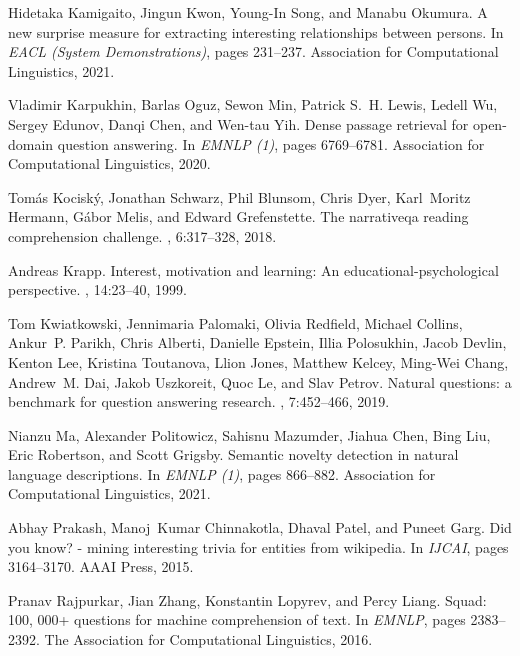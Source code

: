 \documentclass[11pt]{article}
\begin{document}
\begin{thebibliography}{10}
Hidetaka Kamigaito, Jingun Kwon, Young{-}In Song, and Manabu Okumura.
\newblock A new surprise measure for extracting interesting relationships between persons.
\newblock In {\em {EACL} (System Demonstrations)}, pages 231--237. Association for Computational Linguistics, 2021.

Vladimir Karpukhin, Barlas Oguz, Sewon Min, Patrick S.~H. Lewis, Ledell Wu, Sergey Edunov, Danqi Chen, and Wen{-}tau Yih.
\newblock Dense passage retrieval for open-domain question answering.
\newblock In {\em {EMNLP} {(1)}}, pages 6769--6781. Association for Computational Linguistics, 2020.

Tom{\'{a}}s Kocisk{\'{y}}, Jonathan Schwarz, Phil Blunsom, Chris Dyer, Karl~Moritz Hermann, G{\'{a}}bor Melis, and Edward Grefenstette.
\newblock The narrativeqa reading comprehension challenge.
, 6:317--328, 2018.

Andreas Krapp.
\newblock Interest, motivation and learning: An educational-psychological perspective.
, 14:23--40, 1999.

Tom Kwiatkowski, Jennimaria Palomaki, Olivia Redfield, Michael Collins, Ankur~P. Parikh, Chris Alberti, Danielle Epstein, Illia Polosukhin, Jacob Devlin, Kenton Lee, Kristina Toutanova, Llion Jones, Matthew Kelcey, Ming{-}Wei Chang, Andrew~M. Dai, Jakob Uszkoreit, Quoc Le, and Slav Petrov.
\newblock Natural questions: a benchmark for question answering research.
, 7:452--466, 2019.

Nianzu Ma, Alexander Politowicz, Sahisnu Mazumder, Jiahua Chen, Bing Liu, Eric Robertson, and Scott Grigsby.
\newblock Semantic novelty detection in natural language descriptions.
\newblock In {\em {EMNLP} {(1)}}, pages 866--882. Association for Computational Linguistics, 2021.

Abhay Prakash, Manoj~Kumar Chinnakotla, Dhaval Patel, and Puneet Garg.
\newblock Did you know? - mining interesting trivia for entities from wikipedia.
\newblock In {\em {IJCAI}}, pages 3164--3170. {AAAI} Press, 2015.

Pranav Rajpurkar, Jian Zhang, Konstantin Lopyrev, and Percy Liang.
\newblock Squad: 100, 000+ questions for machine comprehension of text.
\newblock In {\em {EMNLP}}, pages 2383--2392. The Association for Computational Linguistics, 2016.


\end{thebibliography}
\end{document}
